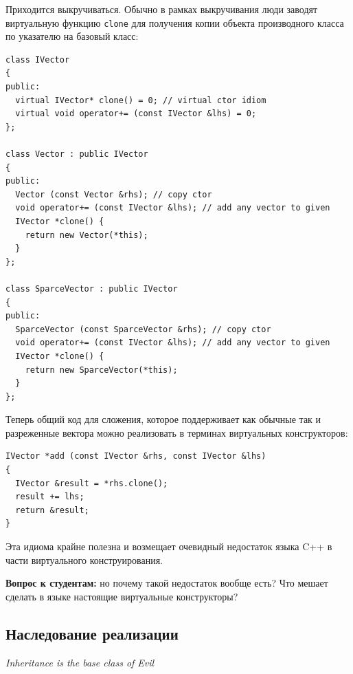 \documentclass[a4paper,12pt,oneside]{article}
\newif\ifanswers
\begin{document}
Приходится выкручиваться. Обычно в рамках выкручивания люди заводят виртуальную функцию \lstinline!clone! для получения копии объекта производного класса по указателю на базовый класс:

\begin{lstlisting}
class IVector
{
public:
  virtual IVector* clone() = 0; // virtual ctor idiom
  virtual void operator+= (const IVector &lhs) = 0;
};

class Vector : public IVector
{
public: 
  Vector (const Vector &rhs); // copy ctor
  void operator+= (const IVector &lhs); // add any vector to given
  IVector *clone() {
    return new Vector(*this);
  }
};

class SparceVector : public IVector
{
public: 
  SparceVector (const SparceVector &rhs); // copy ctor
  void operator+= (const IVector &lhs); // add any vector to given
  IVector *clone() {
    return new SparceVector(*this);
  }
};
\end{lstlisting}

Теперь общий код для сложения, которое поддерживает как обычные так и разреженные вектора можно реализовать в терминах виртуальных конструкторов:

\begin{lstlisting}
IVector *add (const IVector &rhs, const IVector &lhs)
{
  IVector &result = *rhs.clone();
  result += lhs;
  return &result;
}
\end{lstlisting}

Эта идиома крайне полезна и возмещает очевидный недостаток языка C++ в части виртуального конструирования.

\textbf{Вопрос к студентам:} но почему такой недостаток вообще есть? Что мешает сделать в языке настоящие виртуальные конструкторы?

\ifanswers
Правильный ответ: именно конструктор делает ту работу, которая должна быть сделана чтобы заработал механизм виртуальных функций. Поэтому в конструкторе класса виртуальные вызовы работают как не виртуальные. Поэтому даже если бы можно было сделать конструктор виртуальным, его вызов все равно был бы вызовом невиртуальной функции.
\fi

\pagebreak
\subsection{Наследование реализации}\label{ImplInheritance}

\hfill\textit{Inheritance is the base class of Evil} {\vspace{0.5em}}
\end{document}
